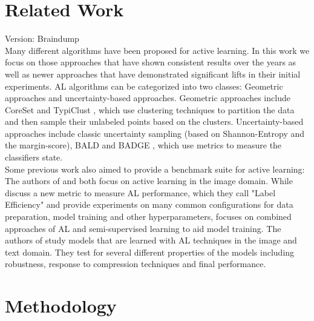 \documentclass[]{article}
\begin{document}
\section{Related Work}
{\color{red} Version: Braindump}\\
Many different algorithms have been proposed for active learning. 
In this work we focus on those approaches that have shown consistent results over the years as well as newer approaches that have demonstrated significant lifts in their initial experiments.
AL algorithms can be categorized into two classes: Geometric approaches and uncertainty-based approaches.
Geometric approaches include CoreSet \cite{sener2017active} and TypiClust \cite{hacohen2022active}, which use clustering techniques to partition the data and then sample their unlabeled points based on the clusters.
Uncertainty-based approaches include classic uncertainty sampling (based on Shannon-Entropy and the margin-score), BALD \cite{kirsch2019batchbald} and BADGE \cite{ashdeep}, which use metrics to measure the classifiers state. \\ [1mm]
%
Some previous work also aimed to provide a benchmark suite for active learning:
The authors of \cite{beck2021effective} and \cite{li2022empirical} both focus on active learning in the image domain.
While \cite{beck2021effective} discuss a new metric to measure AL performance, which they call "Label Efficiency" and provide experiments on many common configurations for data preparation, model training and other hyperparameters, \cite{li2022empirical} focuses on combined approaches of AL and semi-supervised learning to aid model training.
The authors of \cite{hu2021towards} study models that are learned with AL techniques in the image and text domain.
They test for several different properties of the models including robustness, response to compression techniques and final performance.


\section{Methodology}

\end{document}
